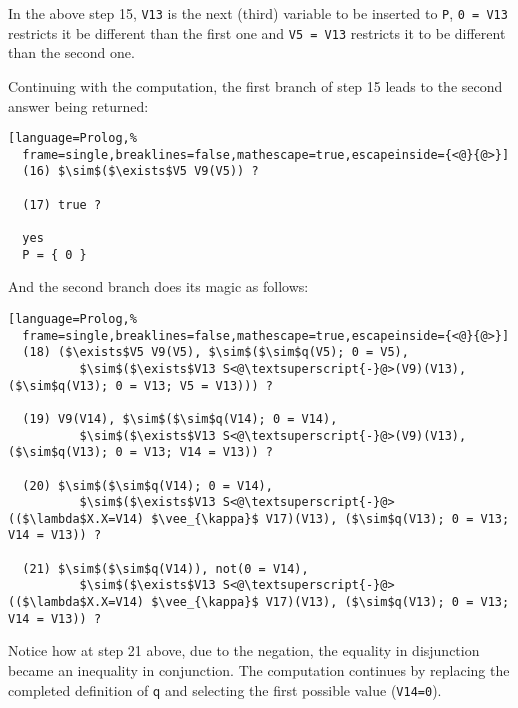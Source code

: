 \documentclass[inscr,ack,preface]{dithesis}
\theoremstyle{definition}
\newcommand{\msf}[1]{$\mathsf{#1}$}
\begin{document}
In the above step 15, \texttt{V13} is the next (third) variable to be inserted to \texttt{P}, \texttt{0 = V13} restricts it be different than the first one and \texttt{V5 = V13} restricts it to be different than the second one.

Continuing with the computation, the first branch of step 15 leads to the second answer being returned:
\begin{lstlisting}[language=Prolog,%
  frame=single,breaklines=false,mathescape=true,escapeinside={<@}{@>}]
  (16) $\sim$($\exists$V5 V9(V5)) ?

  (17) true ?

  yes
  P = { 0 }
\end{lstlisting}

And the second branch does its magic as follows:
\begin{lstlisting}[language=Prolog,%
  frame=single,breaklines=false,mathescape=true,escapeinside={<@}{@>}]
  (18) ($\exists$V5 V9(V5), $\sim$($\sim$q(V5); 0 = V5),
          $\sim$($\exists$V13 S<@\textsuperscript{-}@>(V9)(V13), ($\sim$q(V13); 0 = V13; V5 = V13))) ?

  (19) V9(V14), $\sim$($\sim$q(V14); 0 = V14),
          $\sim$($\exists$V13 S<@\textsuperscript{-}@>(V9)(V13), ($\sim$q(V13); 0 = V13; V14 = V13)) ?

  (20) $\sim$($\sim$q(V14); 0 = V14),
          $\sim$($\exists$V13 S<@\textsuperscript{-}@>(($\lambda$X.X=V14) $\vee_{\kappa}$ V17)(V13), ($\sim$q(V13); 0 = V13; V14 = V13)) ?

  (21) $\sim$($\sim$q(V14)), not(0 = V14),
          $\sim$($\exists$V13 S<@\textsuperscript{-}@>(($\lambda$X.X=V14) $\vee_{\kappa}$ V17)(V13), ($\sim$q(V13); 0 = V13; V14 = V13)) ?
\end{lstlisting}

Notice how at step 21 above, due to the negation, the equality in disjunction became an inequality in conjunction. The computation continues by replacing the completed definition of \msf{q} and selecting the first possible value (\texttt{V14=0}).
\end{document}
